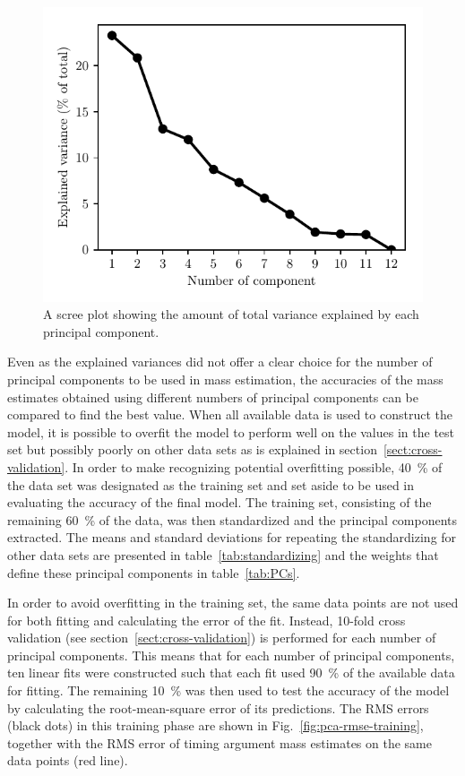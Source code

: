 \documentclass[english, oneside]{HYgradu}
\begin{document}
\begin{figure}
    \centering
    \includegraphics{kuvat/PCA/scree.pdf}
    \caption{A scree plot showing the amount of total variance explained by each principal component.}\label{fig:pca-scree}
\end{figure}


Even as the explained variances did not offer a clear choice for the number of principal components to be used in mass estimation, the accuracies of the mass estimates obtained using different numbers of principal components can be compared to find the best value. When all available data is used to construct the model, it is possible to overfit the model to perform well on the values in the test set but possibly poorly on other data sets as is explained in section~\ref{sect:cross-validation}. In order to make recognizing potential overfitting possible, 40~\% of the data set was designated as the training set and set aside to be used in evaluating the accuracy of the final model. The training set, consisting of the remaining 60~\% of the data, was then standardized and the principal components extracted. The means and standard deviations for repeating the standardizing for other data sets are presented in table~\ref{tab:standardizing} and the weights that define these principal components in table~\ref{tab:PCs}.

In order to avoid overfitting in the training set, the same data points are not used for both fitting and calculating the error of the fit. Instead, 10-fold cross validation (see section~\ref{sect:cross-validation}) is performed for each number of principal components. 
This means that for each number of principal components, ten linear fits were constructed such that each fit used 90~\% of the available data for fitting. The remaining 10~\% was then used to test the accuracy of the model by calculating the root-mean-square error of its predictions. The RMS errors (black dots) in this training phase are shown in Fig.~\ref{fig:pca-rmse-training}, together with the RMS error of timing argument mass estimates on the same data points (red line).
\end{document}
